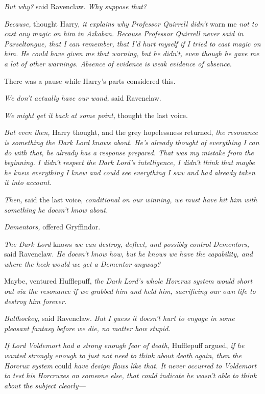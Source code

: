 \emph{But why?} said Ravenclaw. \emph{Why suppose that?}

\emph{Because,} thought Harry, \emph{it explains why Professor Quirrell didn't}
warn me \emph{not to cast any magic on him in Azkaban. Because Professor
Quirrell never said in Parseltongue, that I can remember, that I'd hurt myself
if I tried to cast magic on him. He could have given me that warning, but he
didn't, even though he gave me a lot of other warnings. Absence of evidence is
weak evidence of absence.}

There was a pause while Harry's parts considered this.

\emph{We don't actually have our wand,} said Ravenclaw.

\emph{We might get it back at some point,} thought the last voice.

\emph{But even then,} Harry thought, and the grey hopelessness returned,
\emph{the resonance is something the Dark Lord knows about. He's already
thought of everything I can do with that, he already has a response prepared.
That was my mistake from the beginning. I didn't respect the Dark Lord's
intelligence, I didn't think that maybe he knew everything I knew and could see
everything I saw and had already taken it into account.}

\emph{Then,} said the last voice, \emph{conditional on our winning, we must
have hit him with something he doesn't know about.}

\emph{Dementors,} offered Gryffindor.

\emph{The Dark Lord} knows \emph{we can destroy, deflect, and possibly control
Dementors,} said Ravenclaw. \emph{He doesn't know how, but he knows we have the
capability, and where the heck would we get a Dementor anyway?}

Maybe, ventured Hufflepuff, \emph{the Dark Lord's whole Horcrux system would
short out via the resonance if we grabbed him and held him, sacrificing our own
life to destroy him forever.}

\emph{Bullhockey,} said Ravenclaw. \emph{But I guess it doesn't hurt to engage
in some pleasant fantasy before we die, no matter how stupid.}

\emph{If Lord Voldemort had a strong enough fear of death,} Hufflepuff argued,
\emph{if he wanted strongly enough to just not need to think about death again,
then the Horcrux system} could \emph{have design flaws like that. It never
occurred to Voldemort to test his Horcruxes on someone else, that could
indicate he wasn't able to think about the subject clearly---}

